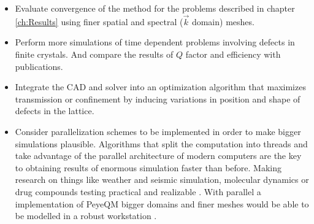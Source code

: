 \begin{itemize}
%
\item Evaluate convergence of the method for the problems described in chapter \ref{ch:Results} using finer spatial and spectral ($\vec{k}$ domain) meshes.
%
\item Perform more simulations of time dependent problems involving defects in finite crystals. And compare the results of $Q$ factor and efficiency with  publications.
%
\item Integrate the CAD and solver into an optimization algorithm that maximizes transmission or confinement by inducing variations in position and shape of defects in the lattice.
%
\item Consider parallelization schemes to be implemented in order to make bigger simulations plausible. Algorithms that split the computation into threads and take advantage of the parallel architecture of modern computers are the key to obtaining results of enormous simulation faster than before. Making research on things like weather and seismic simulation, molecular dynamics or drug compounds testing practical and realizable . With parallel  a implementation of PeyeQM bigger domains and finer meshes would be able to be modelled in a robust workstation .
\end{itemize}


